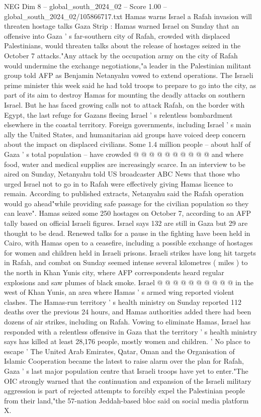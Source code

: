 \begin{textsample}{NEG Dim 8 – global\_south\_2024\_02 – Score 1.00 – global\_south\_2024\_02/105866717.txt}  \label{ex:f8_neg_260}
Hamas warns Israel a Rafah invasion will threaten hostage talks Gaza Strip : Hamas warned Israel on Sunday that an offensive into Gaza ' s far-southern city of Rafah, crowded with displaced Palestinians, would threaten talks about the release of hostages seized in the October 7 attacks."Any attack by the occupation army on the city of Rafah would undermine the exchange negotiations,"a leader in the Palestinian militant group told AFP as Benjamin Netanyahu vowed to extend operations.
The Israeli prime minister this week said he had told troops to prepare to go into the city, as part of its aim to destroy Hamas for mounting the deadly attacks on southern Israel.
But he has faced growing calls not to attack Rafah, on the border with Egypt, the last refuge for Gazans fleeing Israel ' s relentless bombardment elsewhere in the coastal territory.
Foreign governments, including Israel ' s main ally the United States, and humanitarian aid groups have voiced deep concern about the impact on displaced civilians.
Some 1.4 million people -- about half of Gaza ' s total population -- have crowded @ @ @ @ @ @ @ @ @ @ and where food, water and medical supplies are increasingly scarce.
In an interview to be aired on Sunday, Netanyahu told US broadcaster ABC News that those who urged Israel not to go in to Rafah were effectively giving Hamas licence to remain.
According to published extracts, Netanyahu said the Rafah operation would go ahead"while providing safe passage for the civilian population so they can leave".
Hamas seized some 250 hostages on October 7, according to an AFP tally based on official Israeli figures.
Israel says 132 are still in Gaza but 29 are thought to be dead.
Renewed talks for a pause in the fighting have been held in Cairo, with Hamas open to a ceasefire, including a possible exchange of hostages for women and children held in Israeli prisons.
Israeli strikes have long hit targets in Rafah, and combat on Sunday seemed intense several kilometres ( miles ) to the north in Khan Yunis city, where AFP correspondents heard regular explosions and saw plumes of black smoke.
Israel @ @ @ @ @ @ @ @ @ @ in the west of Khan Yunis, an area where Hamas ' s armed wing reported violent clashes.
The Hamas-run territory ' s health ministry on Sunday reported 112 deaths over the previous 24 hours, and Hamas authorities added there had been dozens of air strikes, including on Rafah.
Vowing to eliminate Hamas, Israel has responded with a relentless offensive in Gaza that the territory ' s health ministry says has killed at least 28,176 people, mostly women and children. ' No place to escape ' The United Arab Emirates, Qatar, Oman and the Organisation of Islamic Cooperation became the latest to raise alarm over the plan for Rafah, Gaza ' s last major population centre that Israeli troops have yet to enter."The OIC strongly warned that the continuation and expansion of the Israeli military aggression is part of rejected attempts to forcibly expel the Palestinian people from their land,"the 57-nation Jeddah-based bloc said on social media platform X.

\end{textsample}
